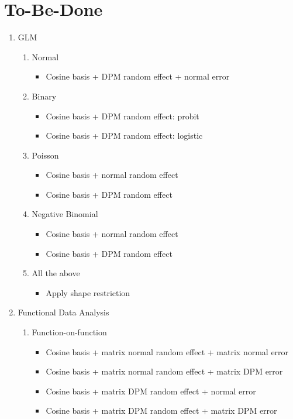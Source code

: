 \documentclass[11pt]{article}
\begin{document}
  \section{To-Be-Done}
    \begin{enumerate}
      \item GLM
        \begin{enumerate}
          \item Normal
            \begin{itemize}
              \item Cosine basis + DPM random effect + normal error
            \end{itemize}
          \item Binary
            \begin{itemize}
              \item Cosine basis + DPM random effect: probit
              \item Cosine basis + DPM random effect: logistic
            \end{itemize}
          \item Poisson
            \begin{itemize}
              \item Cosine basis + normal random effect
              \item Cosine basis + DPM random effect
            \end{itemize}
          \item Negative Binomial
            \begin{itemize}
              \item Cosine basis + normal random effect
              \item Cosine basis + DPM random effect
            \end{itemize}
          \item All the above
            \begin{itemize}
              \item Apply shape restriction
            \end{itemize}
        \end{enumerate}
      \item Functional Data Analysis
        \begin{enumerate}
          \item Function-on-function
            \begin{itemize}
              \item Cosine basis + matrix normal random effect + matrix normal error
              \item Cosine basis + matrix normal random effect + matrix DPM error
              \item Cosine basis + matrix DPM random effect + normal error
              \item Cosine basis + matrix DPM random effect + matrix DPM error
            \end{itemize}
        \end{enumerate}
    \end{enumerate}
\end{document}
